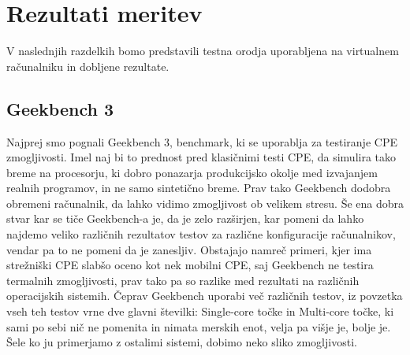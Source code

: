 \section{Rezultati meritev}

V naslednjih razdelkih bomo predstavili testna orodja uporabljena na virtualnem računalniku in dobljene rezultate.

\subsection{Geekbench 3}
Najprej smo pognali Geekbench 3, benchmark, ki se uporablja za testiranje CPE zmogljivosti. Imel naj bi to prednost pred klasičnimi testi CPE, da simulira tako breme na procesorju, ki dobro ponazarja produkcijsko okolje med izvajanjem realnih programov, in ne samo sintetično breme. Prav tako Geekbench dodobra obremeni računalnik, da lahko vidimo zmogljivost ob velikem stresu. Še ena dobra stvar kar se tiče Geekbench-a je, da je zelo razširjen, kar pomeni da lahko najdemo veliko različnih rezultatov testov za različne konfiguracije računalnikov, vendar pa to ne pomeni da je zanesljiv. Obstajajo namreč primeri, kjer ima strežniški CPE slabšo oceno kot nek mobilni CPE, saj Geekbench ne testira termalnih zmogljivosti, prav tako pa so razlike med rezultati na različnih operacijskih sistemih. Čeprav Geekbench uporabi več različnih testov, iz povzetka vseh teh testov vrne dve glavni številki: Single-core točke in Multi-core točke, ki sami po sebi nič ne pomenita in nimata merskih enot, velja pa višje je, bolje je. Šele ko ju primerjamo z ostalimi sistemi, dobimo neko sliko zmogljivosti. 

